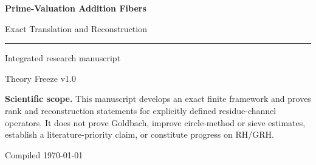 \documentclass[11pt]{article}
\theoremstyle{definition}
\newcommand{\N}{\mathbb N}
\newcommand{\F}{\mathcal F}
\newcommand{\G}{\mathcal G}
\newcommand{\rank}{\operatorname{rank}}
\begin{document}
\begin{titlepage}
\centering
\vspace*{2.2cm}
{\sffamily\bfseries\color{navy}\fontsize{25}{31}\selectfont Prime-Valuation Addition Fibers\par}
\vspace{0.35cm}
{\sffamily\color{slate}\fontsize{17}{22}\selectfont Exact Translation and Reconstruction\par}
\vspace{1.2cm}
\rule{0.72\textwidth}{0.6pt}
\vspace{1.2cm}
{\large Integrated research manuscript\par}
\vspace{0.25cm}
{\normalsize Theory Freeze v1.0\par}
\vfill
\begin{minipage}{0.82\textwidth}
\colorbox{light}{\parbox{0.94\textwidth}{\small\textbf{Scientific scope.} This manuscript develops an exact finite framework and proves rank and reconstruction statements for explicitly defined residue-channel operators. It does not prove Goldbach, improve circle-method or sieve estimates, establish a literature-priority claim, or constitute progress on RH/GRH.}}
\end{minipage}
\vfill
{\small Compiled \today\par}
\end{titlepage}

\begin{abstract}
For an integer $N\ge2$, define the ordered positive addition fiber
\[
\F_N^+=\{(a,b)\in\N_{\ge1}^2:a+b=N\}
\]
and its image in prime-valuation coordinates
\[
\G_N=(\nu\times\nu)(\F_N^+).
\]
Because the prime-valuation map is injective on positive integers, this passage loses no information. We develop the counting measure on $\G_N$, prove an exact fiber form of additive convolution, identify the prime and prime-power loci, and define modular difference-channel operators on fiber weights. For a modulus $r$, we prove
\[
\rank D_{N,r}=\min\!\left(N-1,\frac r{\gcd(2,r)}\right).
\]
For a family of moduli with least common multiple $L$, the corresponding joint-signature operator has rank
\[
\rank J_{N;\mathbf r}=\min\!\left(N-1,\frac L{\gcd(2,L)}\right).
\]
When the joint operator is injective, all its nonzero singular values equal $1$. The framework separates exact recoding, exact finite-dimensional reconstruction, analytic estimates, and open prime-producing questions.
\end{abstract}
\end{document}
